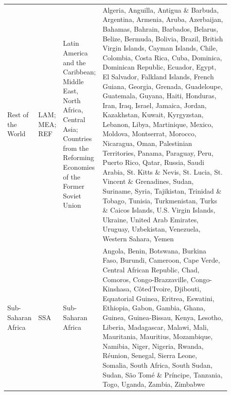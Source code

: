 \begin{longtable}{>{\raggedright\arraybackslash}p{0.12\linewidth}>{\raggedright\arraybackslash}p{0.03\linewidth}>{\raggedright\arraybackslash}p{0.16\linewidth}>{\raggedright\arraybackslash}p{0.6\linewidth}}
Rest of the World & LAM; MEA; REF & Latin America and the Caribbean; Middle East, North Africa, Central Asia; Countries from the Reforming Economies of the Former Soviet Union & Algeria, Anguilla, Antigua \& Barbuda, Argentina, Armenia, Aruba, Azerbaijan, Bahamas, Bahrain, Barbados, Belarus, Belize, Bermuda, Bolivia, Brazil, British Virgin Islands, Cayman Islands, Chile, Colombia, Costa Rica, Cuba, Dominica, Dominican Republic, Ecuador, Egypt, El Salvador, Falkland Islands, French Guiana, Georgia, Grenada, Guadeloupe, Guatemala, Guyana, Haiti, Honduras, Iran, Iraq, Israel, Jamaica, Jordan, Kazakhstan, Kuwait, Kyrgyzstan, Lebanon, Libya, Martinique, Mexico, Moldova, Montserrat, Morocco, Nicaragua, Oman, Palestinian Territories, Panama, Paraguay, Peru, Puerto Rico, Qatar, Russia, Saudi Arabia, St. Kitts \& Nevis, St. Lucia, St. Vincent \& Grenadines, Sudan, Suriname, Syria, Tajikistan, Trinidad \& Tobago, Tunisia, Turkmenistan, Turks \& Caicos Islands, U.S. Virgin Islands, Ukraine, United Arab Emirates, Uruguay, Uzbekistan, Venezuela, Western Sahara, Yemen \\
Sub-Saharan Africa & SSA & Sub-Saharan Africa & Angola, Benin, Botswana, Burkina Faso, Burundi, Cameroon, Cape Verde, Central African Republic, Chad, Comoros, Congo-Brazzaville, Congo-Kinshasa, Côted'Ivoire, Djibouti, Equatorial Guinea, Eritrea, Eswatini, Ethiopia, Gabon, Gambia, Ghana, Guinea, Guinea-Bissau, Kenya, Lesotho, Liberia, Madagascar, Malawi, Mali, Mauritania, Mauritius, Mozambique, Namibia, Niger, Nigeria, Rwanda, Réunion, Senegal, Sierra Leone, Somalia, South Africa, South Sudan, Sudan, São Tomé \& Príncipe, Tanzania, Togo, Uganda, Zambia, Zimbabwe \\
\end{longtable}
